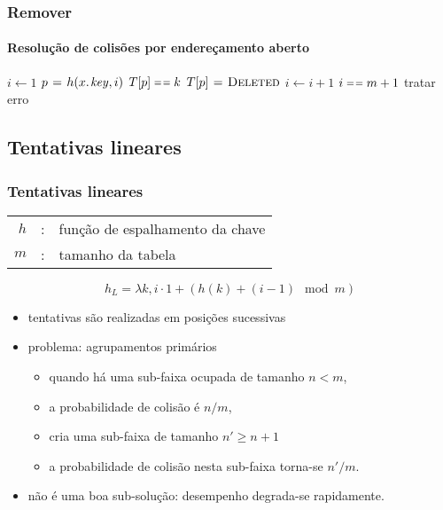 \documentclass{beamer}
\begin{document}
\begin{frame}

\frametitle{Remover}
\framesubtitle{Resolução de colisões por endereçamento aberto}

\begin{codebox}
    \li $i \gets 1$
    \li \Repeat 
    \li   $p \gets h(\attrib{x}{key}, i)$ 
    \li   \If $T[p] \isequal k$
    \li   \Then $T[p] \mathrel{\hspace{1pt}=\hspace{1pt}} \textnormal{\scshape Deleted}$
    \li     \Return
          \End
    \li   $i \gets i+1$
          \End
    \li \Until $i \isequal m+1$
    \li \Comment tratar erro 
\end{codebox}

\end{frame}

\subsection{Tentativas lineares}

\begin{frame}

\frametitle{Tentativas lineares}

\begin{tabular}{rcl}
$h$ & : & função de espalhamento da chave \\
$m$ & : & tamanho da tabela
\end{tabular}

$$h_L = \lambda k, i \cdot 1 + (h(k) + (i - 1) \mod m)$$

\begin{itemize}

\item tentativas são realizadas em posições sucessivas

\item problema: \alert{agrupamentos primários}

\begin{itemize}

  \item quando há uma sub-faixa ocupada de tamanho $n < m$, 

  \item a probabilidade de colisão é $n/m$, 

  \item cria uma sub-faixa de tamanho $n' \ge n+1$

  \item a probabilidade de colisão nesta sub-faixa torna-se $n'/m$.

\end{itemize}

\item não é uma boa sub-solução: desempenho degrada-se rapidamente.

\end{itemize}

\end{frame}
\end{document}
